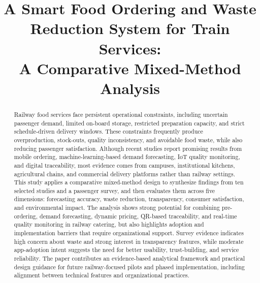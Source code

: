 \documentclass[conference]{IEEEtran}
\begin{document}
\title{A Smart Food Ordering and Waste Reduction System for Train Services:\\
A Comparative Mixed-Method Analysis}

\author{
\IEEEauthorblockA{Department of Computer Science and Engineering\\
Military Institute of Science and Technology\\
Dhaka, Bangladesh\\
}}

\maketitle

\begin{abstract}
Railway food services face persistent operational constraints, including uncertain passenger demand, limited on-board storage, restricted preparation capacity, and strict schedule-driven delivery windows. These constraints frequently produce overproduction, stock-outs, quality inconsistency, and avoidable food waste, while also reducing passenger satisfaction. Although recent studies report promising results from mobile ordering, machine-learning-based demand forecasting, IoT quality monitoring, and digital traceability, most evidence comes from campuses, institutional kitchens, agricultural chains, and commercial delivery platforms rather than railway settings. This study applies a comparative mixed-method design to synthesize findings from ten selected studies and a passenger survey, and then evaluates them across five dimensions: forecasting accuracy, waste reduction, transparency, consumer satisfaction, and environmental impact. The analysis shows strong potential for combining pre-ordering, demand forecasting, dynamic pricing, QR-based traceability, and real-time quality monitoring in railway catering, but also highlights adoption and implementation barriers that require organizational support. Survey evidence indicates high concern about waste and strong interest in transparency features, while moderate app-adoption intent suggests the need for better usability, trust-building, and service reliability. The paper contributes an evidence-based analytical framework and practical design guidance for future railway-focused pilots and phased implementation, including alignment between technical features and organizational practices.
\end{abstract}
\end{document}
